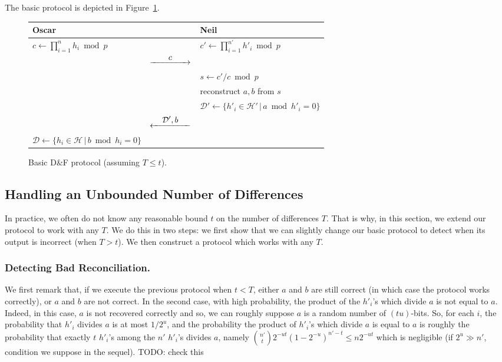 \documentclass{llncs}
\newcommand{\Set}{\mathcal{H}}
\newcommand{\SetD}{\mathcal{D}}
\newcommand{\df}{D\&F\xspace}
\newcommand{\Rflow}[1]{\stackrel{\displaystyle #1}{\hbox to 5em{\rightarrowfill}}}
\newcommand{\Lflow}[1]{\stackrel{\displaystyle #1}{\hbox to 5em{\leftarrowfill}}}
\begin{document}
The basic protocol is depicted in Figure~\ref{fig:basic-df}.

\begin{figure}
\centering
\begin{tabular}{p{}cp{}}
\toprule
\textbf{Oscar}                    &                        & \textbf{Neil}\\
\midrule
$c \gets \prod_{i=1}^n h_i \bmod p$        &                & $c' \gets \prod_{i=1}^{n'} h'_i \bmod p$ \\
                                  & $\Rflow{c}$            & \\
                                  &                        & $s \gets c'/c \bmod p$ \\
                                  &                        & reconstruct  $a,b$ from $s$\\
                                  &                        & $\SetD' \gets \{ h'_i \in \Set' \,|\, a \bmod h'_i = 0 \}$ \\
                                  & $\Lflow{\SetD',b}$     & \\
$\SetD \gets \{ h_i \in \Set \,|\, b \bmod h_i = 0 \}$ & & \\
\bottomrule
\end{tabular}\vspace{-0.25cm} %
\caption{Basic \df protocol (assuming $T \le t$).}
\label{fig:basic-df}
\end{figure}

\subsection{Handling an Unbounded Number of Differences}

In practice, we often do not know any reasonable bound $t$ on the number of differences $T$.
That is why, in this section, we extend our protocol to work with any $T$.
We do this in two steps: we first show that we can slightly change our basic protocol to detect when its output is incorrect (when $T > t$).
We then construct a protocol which works with any $T$.

\subsubsection{Detecting Bad Reconciliation.}
We first remark that, if we execute the previous protocol when $t < T$, either $a$ and $b$ are still correct (in which case the protocol works correctly), or $a$ and $b$ are not correct.
In the second case, with high probability, the product of the $h'_i$'s which divide $a$ is not equal to $a$.
Indeed, in this case, $a$ is not recovered correctly and so, we can roughly suppose $a$ is a random number of $(tu)$-bits. So, for each $i$, the probability that $h'_i$ divides $a$ is at most $1/2^u$, and the probability the product of $h'_i$'s which divide $a$ is equal to $a$ is roughly the probability that exactly $t$ $h'_i$'s among the $n'$ $h'_i$'s divides $a$, namely $\binom{n'}{t} 2^{-ut} (1-2^{-u})^{n'-t} \le n 2^{-ut}$ which is negligible (if $2^{u} \gg n'$, condition we suppose in the sequel).
TODO: check this
\end{document}
